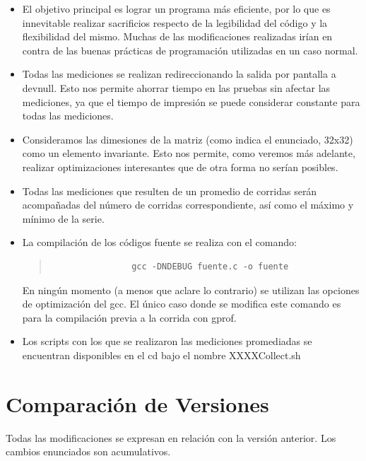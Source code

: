 \documentclass[a4paper,10pt]{article}
\begin{document}
\begin{itemize}
 \item {El objetivo principal es lograr un programa m\'as eficiente, por lo que es innevitable realizar sacrificios respecto de la legibilidad del c\'odigo y la flexibilidad del mismo. Muchas de las modificaciones realizadas ir\'ian en contra de las buenas pr\'acticas de programaci\'on utilizadas en un caso normal. }
	
 \item {Todas las mediciones se realizan redireccionando la salida por pantalla a \/dev\/null. Esto nos permite ahorrar tiempo en las pruebas sin afectar las mediciones, ya que el tiempo de impresi\'on se puede considerar constante para todas las mediciones.}
 
 \item {Consideramos las dimesiones de la matriz (como indica el enunciado, 32x32) como un elemento invariante. Esto nos permite, como veremos m\'as adelante, realizar optimizaciones interesantes que de otra forma no ser\'ian posibles.}
 
 \item {Todas las mediciones que resulten de un promedio de corridas ser\'an acompa\~nadas del n\'umero de corridas correspondiente, as\'i como el m\'aximo y m\'inimo de la serie.}
 \item {La compilaci\'on de los c\'odigos fuente se realiza con el comando: 
		\begin{quote}
			\begin{verbatim}
				gcc -DNDEBUG fuente.c -o fuente
			\end{verbatim}
		\end{quote}
	En ning\'un momento (a menos que aclare lo contrario) se utilizan las opciones de optimizaci\'on del gcc. El \'unico caso donde se modifica este comando es para la compilaci\'on previa a la corrida con gprof.}
 \item {Los scripts con los que se realizaron las mediciones promediadas se encuentran disponibles en el cd bajo el nombre XXXXCollect.sh}
 
\end{itemize}
	
\newpage

\section{Comparaci\'on de Versiones}

Todas las modificaciones se expresan en relaci\'on con la versi\'on anterior. Los cambios enunciados son acumulativos.
\end{document}
